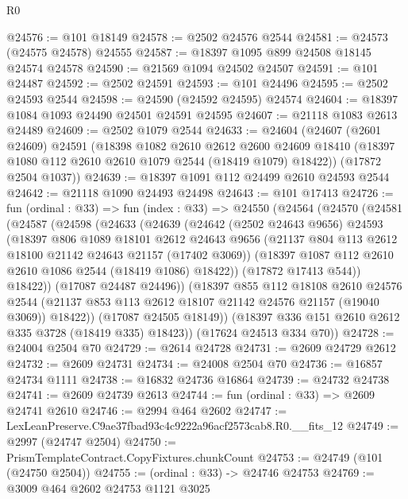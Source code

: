 \begin{lexlean}{R0}
\begin{coremodule}
@24576 := @101 @18149
@24578 := @2502 @24576 @2544
@24581 := @24573 (@24575 @24578) @24555
@24587 := @18397 @1095 @899 @24508 @18145 @24574 @24578
@24590 := @21569 @1094 @24502 @24507
@24591 := @101 @24487
@24592 := @2502 @24591
@24593 := @101 @24496
@24595 := @2502 @24593 @2544
@24598 := @24590 (@24592 @24595) @24574
@24604 := @18397 @1084 @1093 @24490 @24501 @24591 @24595
@24607 := @21118 @1083 @2613 @24489
@24609 := @2502 @1079 @2544
@24633 := @24604
    (@24607
      (@2601 @24609)
      @24591
      (@18398
        @1082
        @2610
        @2612
        @2600
        @24609
        @18410
        (@18397 @1080 @112 @2610 @2610 @1079 @2544 (@18419 @1079) @18422))
      (@17872 @2504 @1037))
@24639 := @18397 @1091 @112 @24499 @2610 @24593 @2544
@24642 := @21118 @1090 @24493 @24498
@24643 := @101 @17413
@24726 := fun (ordinal : @33) =>
  fun (index : @33) =>
  @24550
    (@24564
      (@24570
        (@24581
          (@24587
            (@24598
              (@24633
                (@24639
                  (@24642
                    (@2502 @24643 @9656)
                    @24593
                    (@18397
                      @806
                      @1089
                      @18101
                      @2612
                      @24643
                      @9656
                      (@21137 @804 @113 @2612 @18100 @21142 @24643 @21157 (@17402 @3069))
                      (@18397 @1087 @112 @2610 @2610 @1086 @2544 (@18419 @1086) @18422))
                    (@17872 @17413 @544))
                  @18422))
              (@17087 @24487 @24496))
            (@18397
              @855
              @112
              @18108
              @2610
              @24576
              @2544
              (@21137 @853 @113 @2612 @18107 @21142 @24576 @21157 (@19040 @3069))
              @18422))
          (@17087 @24505 @18149))
        (@18397 @336 @151 @2610 @2612 @335 @3728 (@18419 @335) @18423))
      (@17624 @24513 @334 @70))
@24728 := @24004 @2504 @70
@24729 := @2614 @24728
@24731 := @2609 @24729 @2612
@24732 := @2609 @24731
@24734 := @24008 @2504 @70
@24736 := @16857 @24734 @1111
@24738 := @16832 @24736 @16864
@24739 := @24732 @24738
@24741 := @2609 @24739 @2613
@24744 := fun (ordinal : @33) => @2609 @24741 @2610
@24746 := @2994 @464 @2602
@24747 := LexLeanPreserve.C9ae37fbad93c4c9222a96acf2573cab8.R0.__fits_12
@24749 := @2997 (@24747 @2504)
@24750 := PrismTemplateContract.CopyFixtures.chunkCount
@24753 := @24749 (@101 (@24750 @2504))
@24755 := (ordinal : @33) -> @24746 @24753
@24769 := @3009
    @464
    @2602
    @24753
    @1121
    @3025

\end{coremodule}
\end{lexlean}
